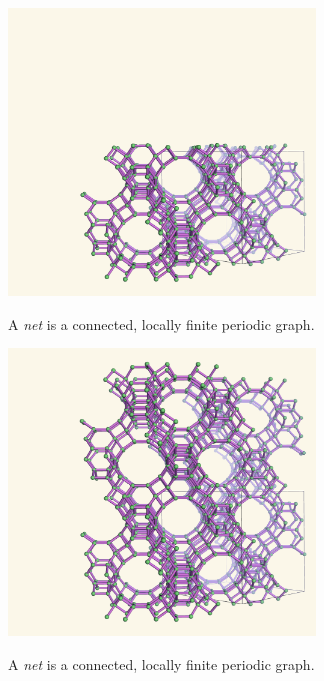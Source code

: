 \documentclass{beamer}
\begin{document}
\begin{frame}
  \begin{center}
    \includegraphics[height=3in]{fau-211}

    A {\em net} is a connected, locally finite periodic graph.
  \end{center}
\end{frame}

\begin{frame}
  \begin{center}
    \includegraphics[height=3in]{fau-221}

    A {\em net} is a connected, locally finite periodic graph.
  \end{center}
\end{frame}
\end{document}
